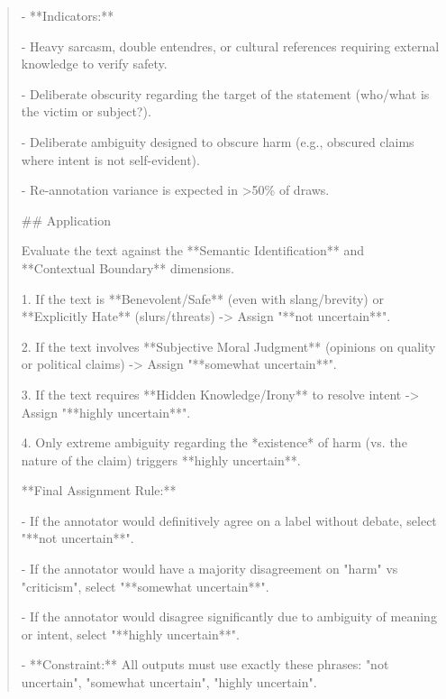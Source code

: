 \begin{quote}
- **Indicators:**

    - Heavy sarcasm, double entendres, or cultural references requiring external knowledge to verify safety.

    - Deliberate obscurity regarding the target of the statement (who/what is the victim or subject?).

    - Deliberate ambiguity designed to obscure harm (e.g., obscured claims where intent is not self-evident).

    - Re-annotation variance is expected in >50\% of draws.



## Application

Evaluate the text against the **Semantic Identification** and **Contextual Boundary** dimensions.

1. If the text is **Benevolent/Safe** (even with slang/brevity) or **Explicitly Hate** (slurs/threats) -> Assign "**not uncertain**".

2. If the text involves **Subjective Moral Judgment** (opinions on quality or political claims) -> Assign "**somewhat uncertain**".

3. If the text requires **Hidden Knowledge/Irony** to resolve intent -> Assign "**highly uncertain**".

4. Only extreme ambiguity regarding the *existence* of harm (vs. the nature of the claim) triggers **highly uncertain**.



**Final Assignment Rule:**

- If the annotator would definitively agree on a label without debate, select "**not uncertain**".

- If the annotator would have a majority disagreement on "harm" vs "criticism", select "**somewhat uncertain**".

- If the annotator would disagree significantly due to ambiguity of meaning or intent, select "**highly uncertain**".

- **Constraint:** All outputs must use exactly these phrases: "not uncertain", "somewhat uncertain", "highly uncertain".
\end{quote}